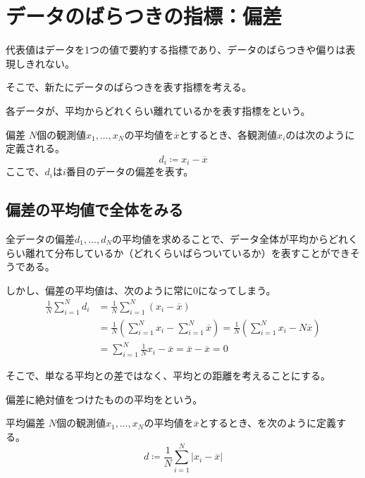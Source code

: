 \documentclass[../../../topic_statistics]{subfiles}
\begin{document}
\sectionline
\section{データのばらつきの指標：偏差}

代表値はデータを1つの値で要約する指標であり、データのばらつきや偏りは表現しきれない。

そこで、新たにデータのばらつきを表す指標を考える。

\br

各データが、平均からどれくらい離れているかを表す指標をという。

\begin{definition}{偏差}
  $N$個の観測値$x_1, \ldots, x_N$の平均値を$\overline{x}$とするとき、各観測値$x_i$のは次のように定義される。
  \begin{equation*}
    d_i \coloneq x_i - \overline{x}
  \end{equation*}
  ここで、$d_i$は$i$番目のデータの偏差を表す。
\end{definition}

\subsection{偏差の平均値で全体をみる}

全データの偏差$d_1, \ldots, d_N$の平均値を求めることで、データ全体が平均からどれくらい離れて分布しているか（どれくらいばらついているか）を表すことができそうである。

\br

しかし、偏差の平均値は、次のように常に0になってしまう。
\begin{align*}
  \frac{1}{N} \sum_{i=1}^{N} d_i
  &= \frac{1}{N} \sum_{i=1}^{N} (x_i - \overline{x}) \\
  &= \frac{1}{N} \left( \sum_{i=1}^N x_i - \sum_{i=1}^{N} \overline{x} \right)
  = \frac{1}{N} \left( \sum_{i=1}^{N} x_i - N \overline{x} \right) \\
  &= \sum_{i=1}^{N} \frac{1}{N}x_i - \overline{x}
  = \overline{x} - \overline{x}
  = 0
\end{align*}

\br

そこで、単なる平均との差ではなく、平均との距離を考えることにする。

偏差に絶対値をつけたものの平均をという。

\begin{definition}{平均偏差}
  $N$個の観測値$x_1,\dots,x_N$の平均値を$\overline{x}$とするとき、を次のように定義する。
  \begin{equation*}
    d \coloneq \frac{1}{N} \sum_{i=1}^{N} |x_i - \overline{x}|
  \end{equation*}
  
\end{definition}
\end{document}
